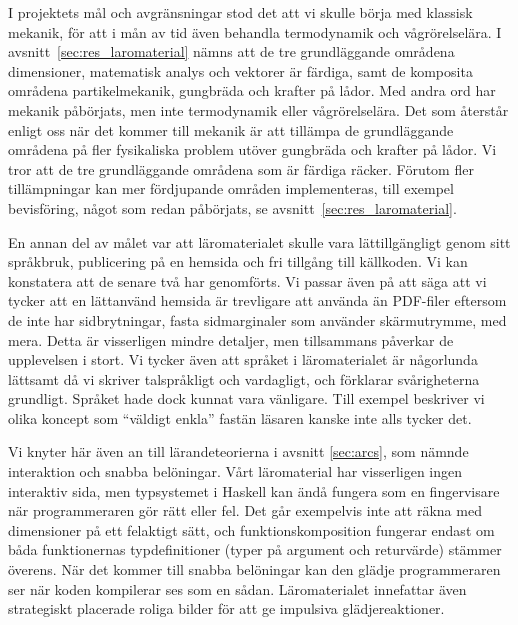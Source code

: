 I projektets mål och avgränsningar stod det att vi skulle börja med klassisk
mekanik, för att i mån av tid även behandla termodynamik och vågrörelselära. I avsnitt~\ref{sec:res_laromaterial} nämns att de tre grundläggande
områdena dimensioner, matematisk analys och vektorer är färdiga, samt de
komposita områdena partikelmekanik, gungbräda och krafter på lådor. Med andra
ord har mekanik påbörjats, men inte termodynamik eller vågrörelselära. Det som återstår enligt oss när det kommer till mekanik är att tillämpa de grundläggande områdena på
fler fysikaliska problem utöver gungbräda och krafter på lådor. Vi tror att de
tre grundläggande områdena som är färdiga räcker. Förutom fler tillämpningar kan
mer fördjupande områden implementeras, till exempel bevisföring, något som redan
påbörjats, se avsnitt~\ref{sec:res_laromaterial}.

En annan del av målet var att läromaterialet skulle vara lättillgängligt genom
sitt språkbruk, publicering på en hemsida och fri tillgång till källkoden.
Vi kan konstatera att de senare två har genomförts. Vi passar även på att
säga att vi tycker att en lättanvänd hemsida är trevligare att använda än
PDF-filer eftersom de inte har sidbrytningar, fasta sidmarginaler som använder
skärmutrymme, med mera. Detta är visserligen mindre detaljer, men tillsammans
påverkar de upplevelsen i stort. Vi
tycker även att språket i läromaterialet är någorlunda lättsamt då vi skriver
talspråkligt och vardagligt, och förklarar svårigheterna grundligt. Språket hade
dock kunnat vara vänligare. Till exempel beskriver vi olika koncept som
``väldigt enkla'' fastän läsaren kanske inte alls tycker det.

Vi knyter här även an till lärandeteorierna i avsnitt \ref{sec:arcs}, som nämnde interaktion och snabba belöningar. Vårt läromaterial har visserligen ingen interaktiv sida, men typsystemet i Haskell kan ändå fungera som en fingervisare när programmeraren gör rätt eller fel. Det går exempelvis inte att räkna med dimensioner på ett felaktigt sätt, och funktionskomposition fungerar endast om båda funktionernas typdefinitioner (typer på argument och returvärde) stämmer överens. När det kommer till snabba belöningar kan den glädje programmeraren ser när koden kompilerar ses som en sådan. Läromaterialet innefattar även strategiskt placerade roliga bilder för att ge impulsiva glädjereaktioner.

